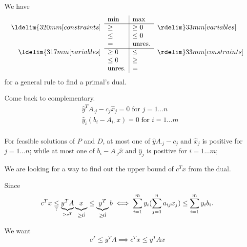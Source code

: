 \begin{note}
	We have
	\[
		\begin{array}{rl|ll}

			                                & \min          & \max          &                                \\
			\cline{2-3}
			\ldelim\{{3}{20mm}[constraints] & \geq          & \geq 0        & \rdelim\}{3}{3mm}[variables]   \\
			                                & \leq          & \leq 0        &                                \\
			                                & =             & \mbox{unres.} &                                \\
			\cline{2-3}
			\ldelim\{{3}{17mm}[variables]   & \geq 0        & \leq          & \rdelim\}{3}{3mm}[constraints] \\
			                                & \leq 0        & \geq          &                                \\
			                                & \mbox{unres.} & =             &                                \\
		\end{array}
	\]
	for a general rule to find a primal's dual.
\end{note}

Come back to complementary.
\[
	\begin{split}
		&\hat{y}^{T} A_{\cdot j} - c_{j}\hat{x}_j = 0\text{ for }j = 1\ldots n\\
		&\hat{y}_i(b_{i} - A_{i\cdot }x) = 0\text{ for }i = 1\ldots m\\
	\end{split}
\]

\begin{note}
	For feasible solutions of \(P\) and \(D\), at most one of \(\hat{y}A_{\cdot j} - c_{j}\) and \(\hat{x}_j\) is positive for \(j = 1\ldots n\);
	while at most one of \(b_{i} - A_{\cdot j}\hat{x}\) and \(\hat{y}_j\) is positive for \(i = 1\ldots m\);
\end{note}

\begin{problem}
We are looking for a way to find out the upper bound of \(c^{T}x\) from the dual.
\end{problem}
Since
\[
	c^{T}x \underset{?}{\leq} \underbrace{y^{T} A }_{\geq c^{T}}\underbrace{\vphantom{y^{T}A}x}_{\geq \vec{0}} \leq \underbrace{y^{T}}_{\geq  \vec{0}}b\iff \sum\limits_{i=1}^{m} y_{i}(\sum\limits_{j=1}^{n} a_{ij}x_{j})\leq \sum\limits_{i=1}^{m} y_{i}b_{i}.
\]
\begin{observe}
	We want
	\[
		c^{T}\leq y^{T}A\implies c^{T}x\leq y^{T} Ax
	\]
\end{observe}


